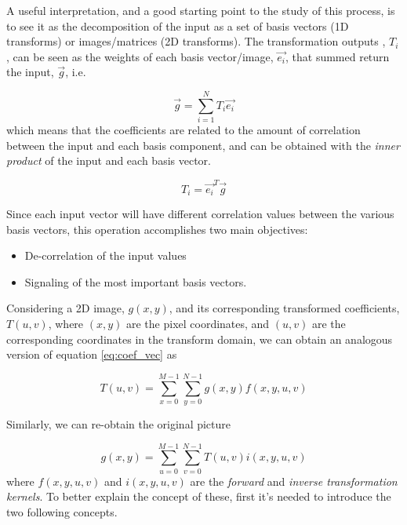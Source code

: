 A useful interpretation, and a good starting point to the study of this process, is to see it as the decomposition of the input as a set of basis vectors (1D transforms) or images/matrices (2D transforms). The transformation outputs , $T_i$, can be seen as the weights of each basis vector/image, $\vec{e_i}$, that summed return the input, $\vec{g}$, i.e.

\begin{equation}
    \vec{g} = \sum_{i=1}^{N} T_i \vec{e_i}
\end{equation}
which means that the coefficients are related to the amount of correlation between the input and each basis component, and can be obtained with the \emph{inner product} of the input and each basis vector.

\begin{equation} \label{eq:coef_vec}
    T_i = \vec{e_i}^T \vec{g}
\end{equation}

Since each input vector will have different correlation values between the various basis vectors, this operation accomplishes two main objectives:

\begin{itemize}
    \item De-correlation of the input values
    \item Signaling of the most important basis vectors.
\end{itemize}

Considering a 2D image, $g(x,y)$, and its corresponding transformed coefficients, $T(u,v)$, where $(x,y)$ are the pixel coordinates, and $(u,v)$ are the corresponding coordinates in the transform domain, we can obtain an analogous version of equation \ref{eq:coef_vec} as

\begin{equation} \label{eq:Tmatsum}
    T(u,v) = \sum_{x=0}^{M-1}\sum_{y=0}^{N-1}g(x,y)f(x,y,u,v)
\end{equation}

Similarly, we can re-obtain the original picture

\begin{equation} \label{eq:Gmatsum}
    g(x,y) = \sum_{u=0}^{M-1}\sum_{v=0}^{N-1}T(u,v)i(x,y,u,v)
\end{equation}
where $f(x,y,u,v)$ and $i(x,y,u,v)$ are the \emph{forward} and \emph{inverse transformation kernels}\label{par:kernel}. To better explain the concept of these, first it's needed to introduce the two following concepts.

